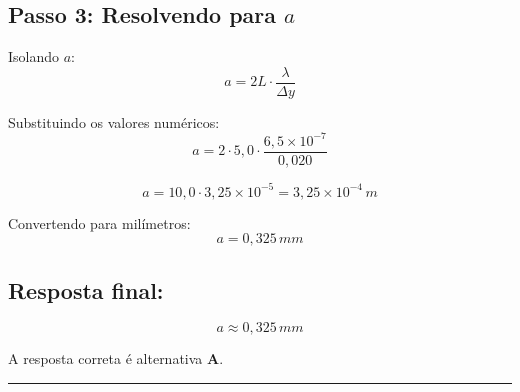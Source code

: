 \documentclass[a4paper,12pt]{article}
\begin{document}
\begin{flushleft}
\vspace{0.5cm}

\subsection*{Passo 3: Resolvendo para \(a\)}

Isolando \(a\):
\[
a = 2L \cdot \frac{\lambda}{\Delta y}
\]

Substituindo os valores numéricos:
\[
a = 2 \cdot 5{,}0 \cdot \frac{6{,}5 \times 10^{-7}}{0{,}020}
\]

\[
a = 10{,}0 \cdot 3{,}25 \times 10^{-5} = 3{,}25 \times 10^{-4}\,m
\]

Convertendo para milímetros:
\[
a = 0{,}325\,mm
\]

\vspace{0.5cm}

\subsection*{Resposta final:}

\[
\boxed{a \approx 0{,}325\,mm}
\]

A resposta correta é alternativa \colorbox{green!50}{\textbf{A}}.
\end{flushleft}

\noindent\rule{\linewidth}{0.6pt}\\
\end{document}
